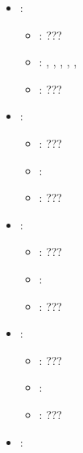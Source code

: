 \begin{itemize}
\begin{itemize}
                \item \optionPossibleValues{}: ???
                \item \optionDefaultValue{}: 
                \item \optionDescrption{}: ???
           \end{itemize}
    \item {}:
           \begin{itemize}
                \item \optionPossibleValues{}: ???
                \item \optionDefaultValue{}: \optionDefaultValueStyle{[0.5}, , , , , \optionDefaultValueStyle{0.99]}
                \item \optionDescrption{}: ???
           \end{itemize}
    \item {}:
           \begin{itemize}
                \item \optionPossibleValues{}: ???
                \item \optionDefaultValue{}: 
                \item \optionDescrption{}: ???
           \end{itemize}
    \item {}:
           \begin{itemize}
                \item \optionPossibleValues{}: ???
                \item \optionDefaultValue{}: 
                \item \optionDescrption{}: ???
           \end{itemize}
    \item {}:
           \begin{itemize}
                \item \optionPossibleValues{}: ???
                \item \optionDefaultValue{}: 
                \item \optionDescrption{}: ???
           \end{itemize}
    \item {}:

\end{itemize}
